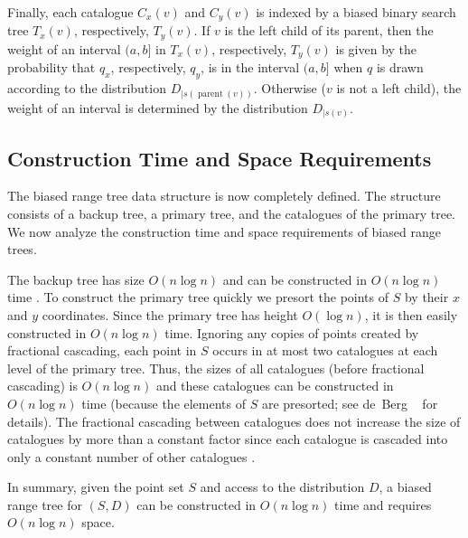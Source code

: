 \documentclass{patmorin}
\DeclareMathOperator{\prnt}{parent}
\begin{document}

Finally, each catalogue $C_x(v)$ and $C_y(v)$ is indexed by a biased
binary search tree $T_x(v)$, respectively, $T_y(v)$.  If $v$ is the
left child of its parent, then the weight of an interval $(a,b]$ in
$T_x(v)$, respectively, $T_y(v)$ is given by the probability that
$q_x$, respectively, $q_y$, is in the interval $(a,b]$ when $q$ is
drawn according to the distribution $D_{\mid s(\prnt(v))}$.  Otherwise
($v$ is not a left child), the weight of an interval is determined by
the distribution $D_{\mid s(v)}$.

\subsection{Construction Time and Space Requirements}

The biased range tree data structure is now completely defined.  The
structure consists of a backup tree, a primary tree, and the
catalogues of the primary tree.  We now analyze the construction time
and space requirements of biased range trees.

The backup tree has size $O(n\log n)$ and can be constructed in
$O(n\log n)$ time \cite[Theorem~5.11]{bkos97}.  To construct the
primary tree quickly we presort the points of $S$ by their $x$ and $y$
coordinates.  Since the primary tree has height $O(\log n)$, it is
then easily constructed in $O(n\log n)$ time.  Ignoring any copies of
points created by fractional cascading, each point in $S$ occurs in at
most two catalogues at each level of the primary tree.  Thus, the sizes
of all catalogues (before fractional cascading) is $O(n\log n)$ and
these catalogues can be constructed in $O(n\log n)$ time (because the
elements of $S$ are presorted; see de~Berg \etal\
\cite[Section~5.3]{bkos97} for details).  The fractional cascading
between catalogues does not increase the size of catalogues by more
than a constant factor since each catalogue is cascaded into only a
constant number of other catalogues \cite{ae76}.

In summary, given the point set $S$ and access to the distribution
$D$, a biased range tree for $(S,D)$ can be constructed in $O(n\log
n)$ time and requires $O(n\log n)$ space.
\end{document}
